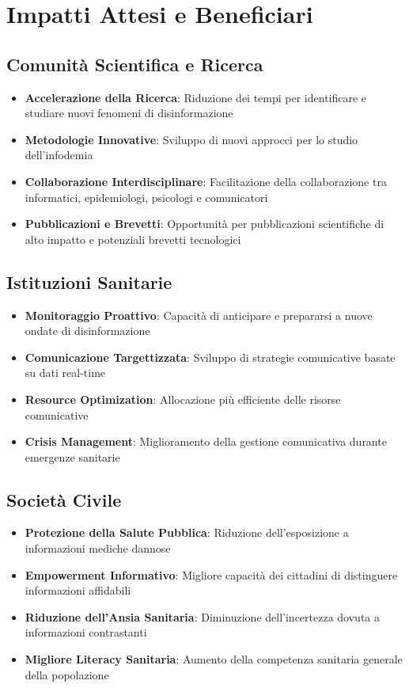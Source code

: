 \documentclass[12pt,a4paper]{report}
\begin{document}
\section{Impatti Attesi e Beneficiari}

\subsection{Comunità Scientifica e Ricerca}

\begin{itemize}
    \item \textbf{Accelerazione della Ricerca}: Riduzione dei tempi per identificare e studiare nuovi fenomeni di disinformazione
    \item \textbf{Metodologie Innovative}: Sviluppo di nuovi approcci per lo studio dell'infodemia
    \item \textbf{Collaborazione Interdisciplinare}: Facilitazione della collaborazione tra informatici, epidemiologi, psicologi e comunicatori
    \item \textbf{Pubblicazioni e Brevetti}: Opportunità per pubblicazioni scientifiche di alto impatto e potenziali brevetti tecnologici
\end{itemize}

\subsection{Istituzioni Sanitarie}

\begin{itemize}
    \item \textbf{Monitoraggio Proattivo}: Capacità di anticipare e prepararsi a nuove ondate di disinformazione
    \item \textbf{Comunicazione Targettizzata}: Sviluppo di strategie comunicative basate su dati real-time
    \item \textbf{Resource Optimization}: Allocazione più efficiente delle risorse comunicative
    \item \textbf{Crisis Management}: Miglioramento della gestione comunicativa durante emergenze sanitarie
\end{itemize}

\subsection{Società Civile}

\begin{itemize}
    \item \textbf{Protezione della Salute Pubblica}: Riduzione dell'esposizione a informazioni mediche dannose
    \item \textbf{Empowerment Informativo}: Migliore capacità dei cittadini di distinguere informazioni affidabili
    \item \textbf{Riduzione dell'Ansia Sanitaria}: Diminuzione dell'incertezza dovuta a informazioni contrastanti
    \item \textbf{Migliore Literacy Sanitaria}: Aumento della competenza sanitaria generale della popolazione
\end{itemize}
\end{document}
